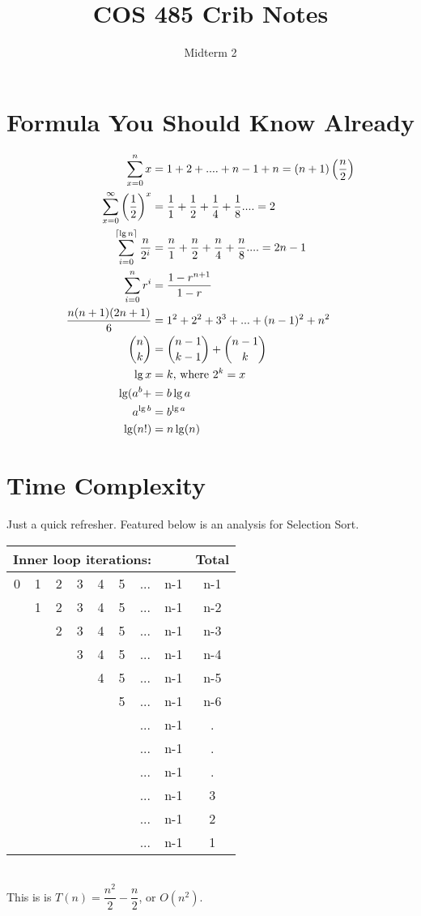 \documentclass[aip, jmp, amsmath,amssymb, reprint]{revtex4-1}
\DeclarePairedDelimiter\ceil{\lceil}{\rceil}
\theoremstyle{definition}
\begin{document}
\title{COS 485 Crib Notes}
\author{Midterm 2}
\maketitle
\section{Formula You Should Know Already}
\begin{align*}
    \sum\limits_{x = 0}^{n} x &= 1 + 2 +....+n-1 + n = (n+1)\left(\frac{n}{2}\right)\\
    \sum\limits_{x = 0}^{\infty} \left(\frac{1}{2}\right)^x &= \frac{1}{1} + \frac{1}{2} + \frac{1}{4} + \frac{1}{8}.... = 2\\
    \sum\limits_{i = 0}^{\ceil{\lg n}} \frac{n}{2^i} &= \frac{n}{1} + \frac{n}{2} + \frac{n}{4} + \frac{n}{8}.... = 2n-1\\
    \sum\limits_{i = 0}^{n} r^i &= \frac{1-r^{n+1}}{1-r}\\
    \frac{n(n+1)(2n+1)}{6} &= 1^2 + 2^2 + 3^3 +...+ (n-1)^2 + n^2\\
    \binom{n}{k} &= \binom{n - 1}{k - 1} + \binom{n - 1}{k}\\
    \lg x &= k\text{, where } 2^k = x\\
    \lg(a^b+ &= b \lg a\\
    a^{\lg b} &= b^{\lg a}\\
    \lg(n!) &= n \lg (n) 
\end{align*}

\section{Time Complexity}
Just a quick refresher. Featured below is an analysis for Selection Sort.\\
\begin{tabular}{c c c c c c c c | c}
\multicolumn{7}{l}{Inner loop iterations:} & & Total\\
\hline
0 & 1 & 2 & 3 & 4 & 5 &...& n-1 & n-1\\
    & 1 & 2 & 3 & 4 & 5 &... & n-1 & n-2\\
    &   & 2 & 3 & 4 & 5 &... & n-1 & n-3\\
    &   &   & 3 & 4 & 5 &... & n-1 & n-4\\
    &   &   &   & 4 & 5 &... & n-1 & n-5\\
    &   &   &   &   & 5 &... & n-1 & n-6\\
    &   &   &   &   &   &... & n-1 & .\\
    &   &   &   &   &   &... & n-1 & .\\
    &   &   &   &   &   &... & n-1 & .\\
    &   &   &   &   &   &... & n-1 & 3\\
    &   &   &   &   &   &... & n-1 & 2\\
    &   &   &   &   &   &... & n-1 & 1\\
\end{tabular}\\
This is is $T(n) = \dfrac{n^2}{2} - \dfrac{n}{2}$, or $O(n^2)$.\\
\end{document}

